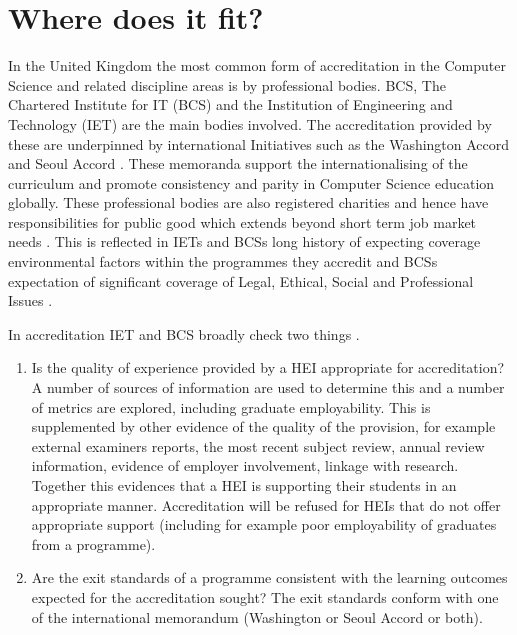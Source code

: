 \documentclass[sigconf]{acmart}
\begin{document}
\section {Where does it fit?	}

In the United Kingdom the most common form of accreditation in the Computer Science and related discipline areas is by professional bodies.  BCS, The Chartered Institute for IT (BCS) and the Institution of Engineering and Technology (IET) are the main bodies involved. The accreditation provided by these %
are underpinned by international Initiatives such as the Washington Accord \cite[for CEng]{Washington2019} and Seoul Accord \cite[for CITP]{Seoul2019}. These memoranda support the internationalising of the curriculum and promote consistency and parity in Computer Science education globally. These professional bodies are also registered charities and hence have responsibilities for public good which extends beyond short term job market needs \cite{Stensaker2006,Mutereko2017}. This is reflected in IETs and BCSs long history of expecting coverage environmental factors within the programmes they accredit and BCSs expectation of significant coverage of Legal, Ethical, Social and Professional Issues \cite{Brooke2018}. 

In accreditation IET and BCS broadly check two things \cite{BCS2018a, IET2019}. 

\begin{enumerate}
    \item Is the quality of experience provided by a HEI appropriate for accreditation?
    A number of sources of information are used to determine this and a number of metrics are explored, including graduate employability.  This is supplemented by other evidence of the quality of the provision, for example external examiners reports, the most recent subject review, annual review information, evidence of employer involvement, linkage with research. Together this evidences that a HEI is supporting their students in an appropriate manner. Accreditation will be refused for HEIs that do not offer appropriate support (including for example poor employability of graduates from a programme).  
    \item Are the exit standards of a programme consistent with the learning outcomes expected for the accreditation sought? The exit standards conform with one of the international memorandum (Washington or Seoul Accord or both). 
\end{enumerate}
\end{document}
